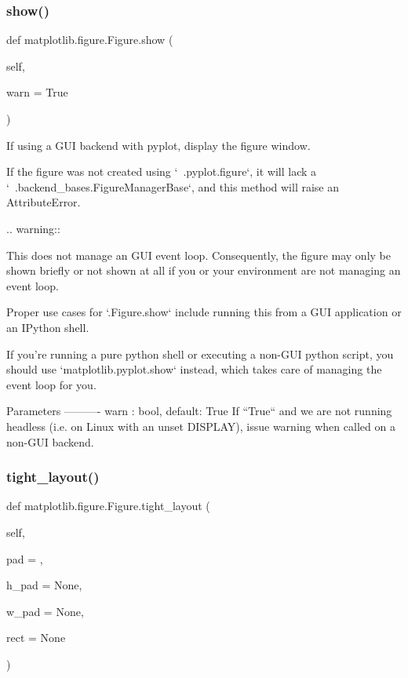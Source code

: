 \subsubsection{\texorpdfstring{show()}{show()}}
{\footnotesize\ttfamily def matplotlib.\+figure.\+Figure.\+show (\begin{DoxyParamCaption}\item[{}]{self,  }\item[{}]{warn = {\ttfamily True} }\end{DoxyParamCaption})}

\begin{DoxyVerb}If using a GUI backend with pyplot, display the figure window.

If the figure was not created using `~.pyplot.figure`, it will lack
a `~.backend_bases.FigureManagerBase`, and this method will raise an
AttributeError.

.. warning::

    This does not manage an GUI event loop. Consequently, the figure
    may only be shown briefly or not shown at all if you or your
    environment are not managing an event loop.

    Proper use cases for `.Figure.show` include running this from a
    GUI application or an IPython shell.

    If you're running a pure python shell or executing a non-GUI
    python script, you should use `matplotlib.pyplot.show` instead,
    which takes care of managing the event loop for you.

Parameters
----------
warn : bool, default: True
    If ``True`` and we are not running headless (i.e. on Linux with an
    unset DISPLAY), issue warning when called on a non-GUI backend.
\end{DoxyVerb}
 \mbox{\label{classmatplotlib_1_1figure_1_1Figure_a3c06e4a0479a4f539f312c5fc9b26ead}} 
\subsubsection{\texorpdfstring{tight\+\_\+layout()}{tight\_layout()}}
{\footnotesize\ttfamily def matplotlib.\+figure.\+Figure.\+tight\+\_\+layout (\begin{DoxyParamCaption}\item[{}]{self,  }\item[{}]{pad = {},  }\item[{}]{h\+\_\+pad = {\ttfamily None},  }\item[{}]{w\+\_\+pad = {\ttfamily None},  }\item[{}]{rect = {\ttfamily None} }\end{DoxyParamCaption})}

